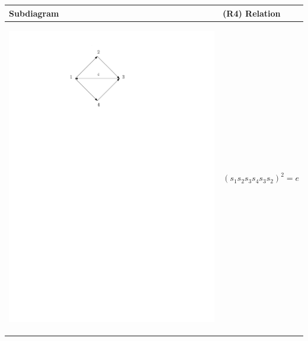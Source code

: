 \documentclass[11pt]{amsart}
\theoremstyle{definition}
\begin{document}
\begin{table} \label{table1}
\begin{tabular}{| p{3.5cm} | p{7cm} |}
\hline
Subdiagram & (R4) Relation \\ \hline
\begin{center}\includegraphics[scale = .30]{Diagram1.pdf}\end{center} & $(s_{1}s_{2}s_{3}s_{4}s_{3}s_{2})^{2} = e$ \\ \hline


\end{tabular}
\end{table}
\end{document}
